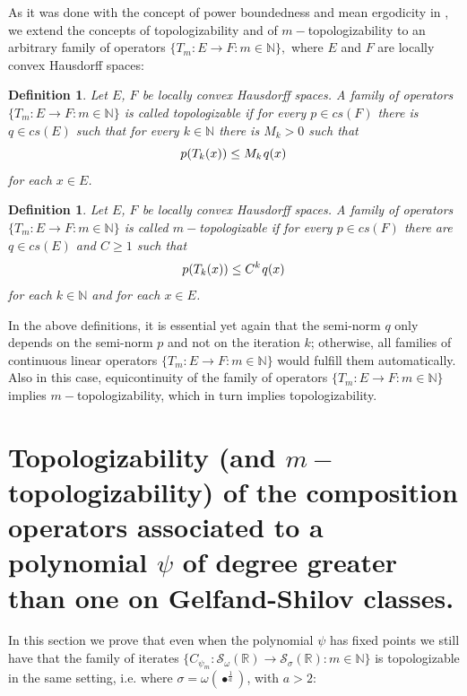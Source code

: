 \documentclass[12pt,reqno]{amsart} %
\newtheorem{definition}[theorem]{Definition}
\numberwithin{equation}{section}
\begin{document}
As it was done with the concept of power boundedness and mean ergodicity in \cite{RACSAM}, we extend the concepts of  topologizability and of $m-$topolo\-gizability to an arbitrary family of operators $\{T_m:E\to F: m\in\mathbb{N}\},$ where $E$ and $F$ are locally convex Hausdorff spaces: 

\begin{definition} Let $E$, $F$ be locally convex Hausdorff spaces.
	A family of operators $\{T_m:E\to F: m\in\mathbb{N}\}$ is called
	topologizable if for every $p\in cs(F)$ there is  $q \in cs(E)$ such that for every $k\in\mathbb{N}$ there is $M_k>0$ such that \begin{equation*}
		p(T_k(x)) \leq M_k \hspace{0.03cm} q(x)
	\end{equation*} for each $x \in E$.
\end{definition}


\begin{definition} Let $E$, $F$ be locally convex Hausdorff spaces.
	A family of operators $\{T_m:E\to F: m\in\mathbb{N}\}$ is called $m-$topologizable if for every  $p\in cs(F)$ there are $q \in cs(E)$ and $C\geq 1$ such that
	\begin{equation*}
		p(T_k(x)) \leq C^k \hspace{0.03cm} q(x)
	\end{equation*} for each $k\in\mathbb{N}$ and for each $x\in E$. 
\end{definition}

In the above definitions, it is essential yet again that the  semi-norm $q$ only depends on the semi-norm $p$ and not on the iteration $k$; otherwise, all families of continuous linear operators $\{T_m:E\to F: m\in\mathbb{N}\}$ would fulfill them automatically. 
Also in this case, equicontinuity of the family of operators $\{T_m:E\to F: m\in\mathbb{N}\}$ implies $m-$topologizability,
which in turn implies topologizability.


\section{Topologizability (and $m-$topologizability) of the composition operators associated to a polynomial $\psi$ of degree greater than one on Gelfand-Shilov classes.} \label{sec2}

In this section we prove that even when the polynomial $\psi$ has fixed points we still have that the family of iterates $\{C_{\psi_m}:\mathcal{S}_{\omega}(\mathbb{R})\to \mathcal{S}_{\sigma}(\mathbb{R}):m\in\mathbb{N}\}$ is topologizable in the same setting, i.e. where $\sigma=\omega(\bullet^{\frac{1}{a}})$, with $a>2$:
\end{document}
